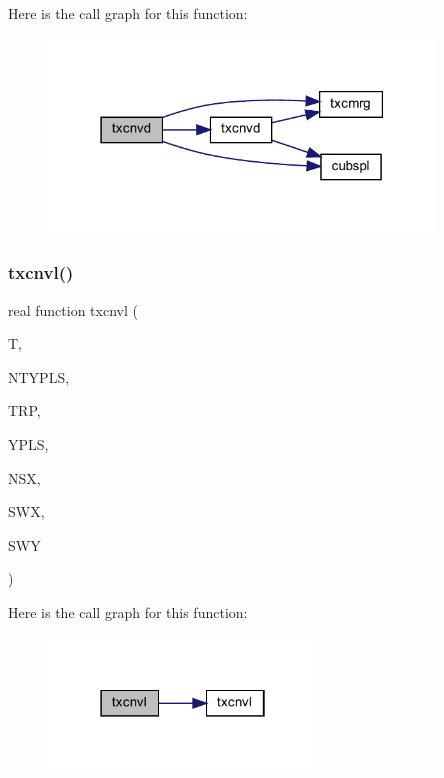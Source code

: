 Here is the call graph for this function\+:\nopagebreak
\begin{figure}[H]
\begin{center}
\leavevmode
\includegraphics[width=291pt]{Leroi__c_8f90_a1cdfcb6ee629073412c28d9cf0215636_cgraph}
\end{center}
\end{figure}
\mbox{\label{Leroi__c_8f90_a1cb0065a1b3068676ef2beb814db93f5}} 
\subsubsection{\texorpdfstring{txcnvl()}{txcnvl()}}
{\footnotesize\ttfamily real function txcnvl (\begin{DoxyParamCaption}\item[{real}]{T,  }\item[{integer}]{N\+T\+Y\+P\+LS,  }\item[{real, dimension(ntypls)}]{T\+RP,  }\item[{real, dimension(4,ntypls)}]{Y\+P\+LS,  }\item[{integer}]{N\+SX,  }\item[{real, dimension(nsx)}]{S\+WX,  }\item[{real, dimension(nsx,3)}]{S\+WY }\end{DoxyParamCaption})}

Here is the call graph for this function\+:\nopagebreak
\begin{figure}[H]
\begin{center}
\leavevmode
\includegraphics[width=202pt]{Leroi__c_8f90_a1cb0065a1b3068676ef2beb814db93f5_cgraph}
\end{center}
\end{figure}
\mbox{\label{Leroi__c_8f90_aa934c3b9754a6a8e18f83b6de33a0df8}} 
